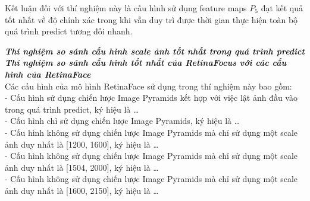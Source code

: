 {    \noindent
    Kết luận đối với thí nghiệm này là cấu hình sử dụng feature maps  ${P}_{5}$ đạt kết quả tốt nhất về độ chính xác trong khi vẫn duy trì được thời gian thực hiện toàn bộ quá trình predict tương đối nhanh.

    \noindent
    \textbf{\textit{Thí nghiệm so sánh cấu hình scale ảnh tốt nhất trong quá trình predict}} \\

    \noindent
    \textbf{\textit{Thí nghiệm so sánh cấu hình tốt nhất của RetinaFocus với các cấu hình của RetinaFace}} \\
    Các cấu hình của mô hình RetinaFace sử dụng trong thí nghiệm này bao gồm: \\
    - Cấu hình sử dụng chiến lược Image Pyramids kết hợp với việc lật ảnh đầu vào trong quá trình predict, ký hiệu là \dots \\
    - Cấu hình chỉ sử dụng chiến lược Image Pyramids, ký hiệu là \dots \\
    - Cấu hình không sử dụng chiến lược Image Pyramids mà chỉ sử dụng một scale ảnh duy nhất là [1200, 1600], ký hiệu là \dots \\
    - Cấu hình không sử dụng chiến lược Image Pyramids mà chỉ sử dụng một scale ảnh duy nhất là [1504, 2000], ký hiệu là \dots \\
    - Cấu hình không sử dụng chiến lược Image Pyramids mà chỉ sử dụng một scale ảnh duy nhất là [1600, 2150], ký hiệu là \dots \\

}
